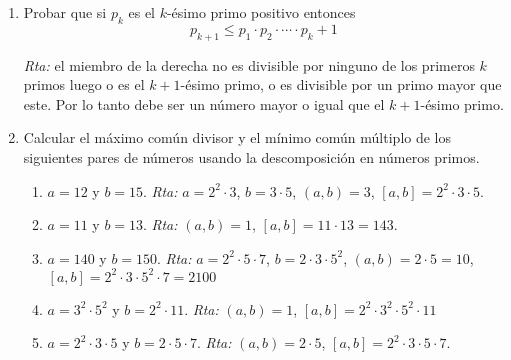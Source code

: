 \documentclass[a4paper,12pt,twoside,spanish,reqno]{amsbook}
\numberwithin{equation}{section}
\newcommand{\rta}{\noindent\textit{Rta: }}
\begin{document}
\begin{enumerate}
\begin{enumerate}
    \rta  Supongamos que existen $m, n$ tal que $21 n^5 = m^5$.  $21 = 3 \cdot 7$ y sea $m = 3^s m_0$ con $3$ y $m_0$ coprimos y $n = 3^r n_0$ con $3$ y $n_0$ coprimos. En particular, $m_0,n_0$  no tienen el primo $3$  en su descomposición. Por lo tanto, 
    $$
    21 n^5 = m^5  \;\Leftrightarrow\;   3\cdot 7 \cdot 3^{5r} n_0^5 =3^{5s} m_0^5
    \;\Leftrightarrow\; 3^{5r+1} \cdot 7  n_0^5 = 3^{5s} m_0^5.
    $$ 
    Como  $m_0^5,n_0^5$  no tienen el primo $3$, por la unicidad de la descomposición en factores primos,    debe ser $3^{5r+1} = 3^{5s}$ y por lo tanto $5r+1 = 5s$, lo cual es absurdo pues $5 | 5s$ y $5 \not| 5r+1$. El absurdo vino de suponer que  existen $m, n$ tal que $21 n^5 = m^5$. 
\end{enumerate}

\item Probar que si $p_k$ es el $k$-\'esimo primo positivo entonces $$p_{k+1}\leq p_1\cdot p_2\cdot \cdots \cdot p_k+1$$

 \rta  el miembro de la derecha no es divisible por ninguno de los primeros $k$ primos luego o es el $k+1$-ésimo primo, o es divisible por un primo mayor que este. Por lo tanto debe ser un número mayor o igual que el $k+1$-ésimo primo.
 
 
 
 


\item Calcular el máximo común divisor y el mínimo común múltiplo de los siguientes pares de números usando la descomposición en números primos. 
\begin{enumerate}
    \item 
    $a = 12$ y $b = 15$.  \rta $a = 2^2 \cdot 3$, $b = 3 \cdot 5$, $(a,b)=3$, $[a,b]=2^2 \cdot 3 \cdot 5$.
    \item 
    $a = 11$ y $b = 13$.  \rta $(a,b)=1$, $[a,b]=11 \cdot 13 =143$.
    \item 
    $a = 140$ y $b = 150$.  \rta $a = 2^2 \cdot 5 \cdot 7$, $b = 2 \cdot 3 \cdot 5^2$,  $(a,b)= 2 \cdot 5 = 10$, $[a,b]=2^2  \cdot 3\cdot 5^2  \cdot 7=2100$
    \item 
    $a = 3^2\cdot5^2$  y $b = 2^2\cdot11$.  \rta  $(a,b)=1$, $[a,b]= 2^2\cdot3^2\cdot5^2\cdot11$ 
    
    \item 
    $a = 2^2\cdot3\cdot5$ y $b = 2\cdot5\cdot7$.  \rta  $(a,b)=2 \cdot 5$, $[a,b]=2^2\cdot3\cdot5\cdot7$.
\end{enumerate}
\end{enumerate}
\end{document}
